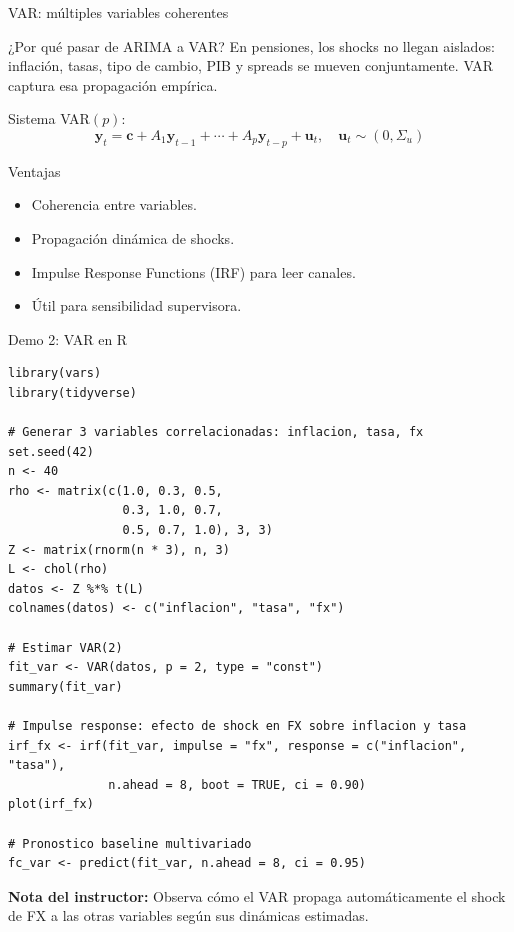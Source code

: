 \documentclass[10pt,aspectratio=169]{beamer}
\begin{document}
\begin{frame}{VAR: múltiples variables coherentes}
\begin{block}{¿Por qué pasar de ARIMA a VAR?}
En pensiones, los shocks no llegan aislados: inflación, tasas, tipo de cambio, PIB y spreads se mueven conjuntamente. VAR captura esa propagación empírica.
\end{block}

Sistema VAR$(p)$:
\[
\bm y_t = \bm c + A_1 \bm y_{t-1} + \cdots + A_p \bm y_{t-p} + \bm u_t, \quad \bm u_t \sim (0,\Sigma_u)
\]

\begin{block}{Ventajas}
\begin{itemize}
  \item Coherencia entre variables.
  \item Propagación dinámica de shocks.
  \item Impulse Response Functions (IRF) para leer canales.
  \item Útil para sensibilidad supervisora.
\end{itemize}
\end{block}
\end{frame}

\begin{frame}[fragile]{Demo 2: VAR en R}
\begin{lstlisting}
library(vars)
library(tidyverse)

# Generar 3 variables correlacionadas: inflacion, tasa, fx
set.seed(42)
n <- 40
rho <- matrix(c(1.0, 0.3, 0.5,
                0.3, 1.0, 0.7,
                0.5, 0.7, 1.0), 3, 3)
Z <- matrix(rnorm(n * 3), n, 3)
L <- chol(rho)
datos <- Z %*% t(L)
colnames(datos) <- c("inflacion", "tasa", "fx")

# Estimar VAR(2)
fit_var <- VAR(datos, p = 2, type = "const")
summary(fit_var)

# Impulse response: efecto de shock en FX sobre inflacion y tasa
irf_fx <- irf(fit_var, impulse = "fx", response = c("inflacion", "tasa"),
              n.ahead = 8, boot = TRUE, ci = 0.90)
plot(irf_fx)

# Pronostico baseline multivariado
fc_var <- predict(fit_var, n.ahead = 8, ci = 0.95)
\end{lstlisting}

\textbf{Nota del instructor:} Observa cómo el VAR propaga automáticamente el shock de FX a las otras variables según sus dinámicas estimadas.
\end{frame}
\end{document}

